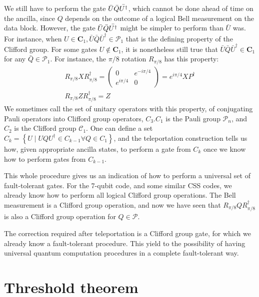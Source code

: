 We still have to perform the gate $\Bar{U} \Bar{Q}\Bar{U^{\dagger}}$, which cannot be done ahead of time on the ancilla, since $Q$ depends on the outcome of a logical Bell measurement on the data block. However, the gate $\Bar{U} \Bar{Q}\Bar{U^{\dagger}}$ might be simpler to perform than $\bar{U}$ was. For instance, when $U \in \mathbf{C}_{1}, \bar{U} \bar{Q} \bar{U}^{\dagger} \in \mathcal{P}_{1}$ that is the defining property of the Clifford group. For some gates $U \notin \mathbf{C}_{1}$, it is nonetheless still true that $\bar{U} \bar{Q} \bar{U}^{\dagger} \in \mathbf{C}_{1}$ for any $\bar{Q} \in \mathcal{P}_{1}$. For instance, the $\pi/8$ rotation $R_{\pi/8}$ has this property:
$$
\begin{array}{l}
R_{\pi / 8} X R_{\pi / 8}^{\dagger}=\left(\begin{array}{cc}
0 & e^{-i \pi / 4} \\
e^{i \pi / 4} & 0
\end{array}\right)=e^{i \pi / 4} X P^{\dagger} \\
R_{\pi / 8} Z R_{\pi / 8}^{\dagger}=Z
\end{array}
$$
We sometimes call the set of unitary operators with this property, of conjugating Pauli operators into Clifford group operators, $C_{3} . C_{1}$ is the Pauli group $\mathcal{P}_{n}$, and $C_{2}$ is the Clifford group $\mathcal{C}_{1} .$
One can define a set $C_{k}=\left\{U \mid U Q U^{\dagger} \in C_{k-1} \forall Q \in C_{1}\right\}$, and the teleportation construction tells us how, given appropriate ancilla states, to perform a gate from $C_{k}$ once we know how to perform gates from $C_{k-1}$.

This whole procedure gives us an indication of how to perform a universal set of fault-tolerant gates. For the 7-qubit code, and some similar CSS codes, we already know how to perform all logical Clifford group operations. The Bell measurement is a Clifford group operation, and now we have seen that $R_{\pi / 8} Q R_{\pi / 8}^{\dagger}$ is also a Clifford group operation for $Q \in \mathcal{P}$.  


The correction required after teleportation is a Clifford group gate, for which we already know a fault-tolerant procedure. This yield to the possibility of having universal quantum computation procedures in a complete fault-tolerant way.





\section{Threshold theorem}



